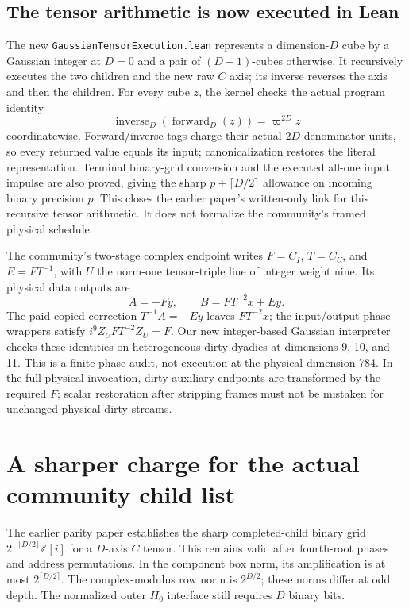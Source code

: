\documentclass[11pt,a4paper]{article}
\newcommand{\Gi}{\mathbb Z[i]}
\newcommand{\pii}{\varpi}
\begin{document}
\subsection*{The tensor arithmetic is now executed in Lean}
The new \texttt{GaussianTensorExecution.lean} represents a dimension-$D$
cube by a Gaussian integer at $D=0$ and a pair of $(D-1)$-cubes otherwise.
It recursively executes the two children and the new raw $C$ axis; its
inverse reverses the axis and then the children. For every cube $z$,
the kernel checks the actual program identity
\[
 \operatorname{inverse}_D(\operatorname{forward}_D(z))
     =\pii^{2D}z
\]
coordinatewise. Forward/inverse tags charge their actual $2D$ denominator
units, so every returned value equals its input; canonicalization restores
the literal representation. Terminal binary-grid conversion and the
executed all-one input impulse are also proved, giving the sharp
$p+\lceil D/2\rceil$ allowance on incoming binary precision $p$.
This closes the earlier paper's written-only link for this recursive tensor
arithmetic. It does not formalize the community's framed physical schedule.

The community's two-stage complex endpoint writes $F=C_I$, $T=C_U$,
and $E=FT^{-1}$, with $U$ the norm-one tensor-triple line of integer
weight nine. Its physical data outputs are
\[
 A=-Fy,\qquad B=FT^{-2}x+Ey.
\]
The paid copied correction $T^{-1}A=-Ey$ leaves $FT^{-2}x$; the
input/output phase wrappers satisfy $i^9Z_UFT^{-2}Z_U=F$.
Our new integer-based Gaussian interpreter checks these identities on
heterogeneous dirty dyadics at dimensions 9, 10, and 11. This is a finite
phase audit, not execution at the physical dimension 784. In the full
physical invocation, dirty auxiliary endpoints are transformed by the
required $F$; scalar restoration after stripping frames must not be
mistaken for unchanged physical dirty streams.

\section{A sharper charge for the actual community child list}
The earlier parity paper establishes the sharp completed-child binary grid
$2^{-\lceil D/2\rceil}\Gi$ for a $D$-axis $C$ tensor. This remains
valid after fourth-root phases and address permutations. In the component
box norm, its amplification is at most $2^{\lceil D/2\rceil}$.
The complex-modulus row norm is $2^{D/2}$; these norms differ at odd depth.
The normalized outer $H_0$ interface still requires $D$ binary bits.
\end{document}
